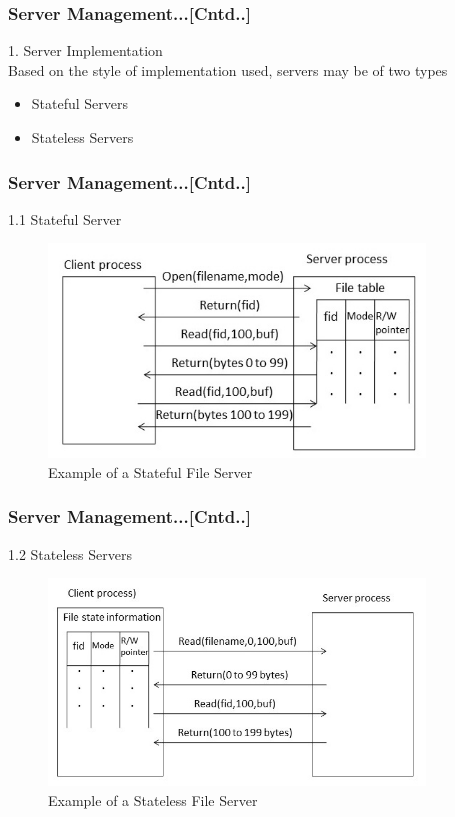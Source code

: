 \documentclass{beamer}
\begin{document}
\begin{frame}
	\frametitle{Server Management...[Cntd..]}
	1. Server Implementation\\
	\vspace{0.3cm}
	Based on the style of implementation used, servers may be of two types
	\vspace{0.3cm}
	\begin{itemize}
		\item Stateful Servers
		\item Stateless Servers
	\end{itemize}
		
	\vspace{5cm}
\end{frame}


\begin{frame}
	\frametitle{Server Management...[Cntd..]}
	1.1 Stateful Server
	\begin{figure}
		\centering
		\includegraphics[width=10cm]{fig45.jpg}
		\caption{Example of a Stateful File Server}
	\end{figure}
\end{frame}

\begin{frame}
	\frametitle{Server Management...[Cntd..]}
	1.2 Stateless Servers
	\begin{figure}
		\centering
		\includegraphics[width=10cm]{fig46.jpg}
		\caption{Example of a Stateless File Server}
	\end{figure}
\end{frame}
\end{document}
